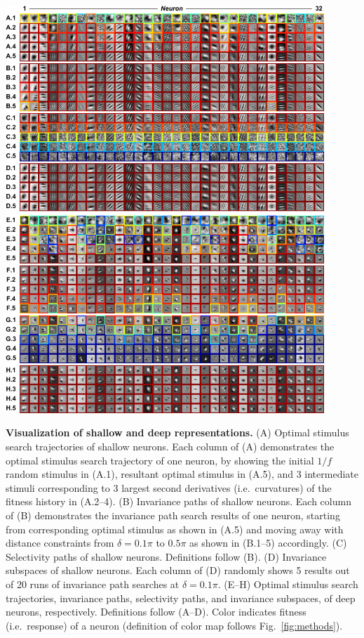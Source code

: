 \begin{FPfigure} %
\begin{minipage}{\textwidth} \centering \includegraphics[width=0.9\textwidth]{Figs/pic1.pdf} \end{minipage}
\caption{
{\bf Visualization of shallow and deep representations.} (A) Optimal stimulus search trajectories of shallow neurons. Each column of (A) demonstrates the optimal stimulus search trajectory of one neuron, by showing the initial ${1}/{f}$ random stimulus in (A.1), resultant optimal stimulus in (A.5), and 3 intermediate stimuli corresponding to 3 largest second derivatives (i.e.~curvatures) of the fitness history in (A.2--4). (B) Invariance paths of shallow neurons. Each column of (B) demonstrates the invariance path search results of one neuron, starting from corresponding optimal stimulus as shown in (A.5) and moving away with distance constraints from $\delta = 0.1\pi$ to $0.5\pi$ as shown in (B.1--5) accordingly. (C) Selectivity paths of shallow neurons. Definitions follow (B). (D) Invariance subspaces of shallow neurons. Each column of (D) randomly shows 5 results out of 20 runs of invariance path searches at $\delta = 0.1\pi$. (E--H) Optimal stimulus search trajectories, invariance paths, selectivity paths, and invariance subspaces, of deep neurons, respectively. Definitions follow (A--D). Color indicates fitness (i.e.~response) of a neuron (definition of color map follows Fig.~\ref{fig:methods}).}
\label{fig:ind_res}
\end{FPfigure} %

